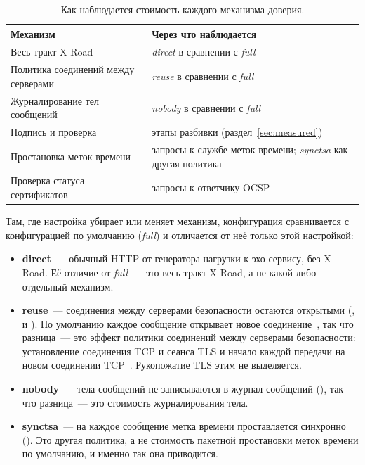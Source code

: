 \documentclass[conference,a4paper]{IEEEtran}
\begin{document}
\begin{table}[t]
\centering\small
\caption{Как наблюдается стоимость каждого механизма доверия.}
\label{tab:mech}
\begin{tabular}{@{}p{}p{}@{}}
\toprule
Механизм & Через что наблюдается \\
\midrule
Весь тракт X-Road & \emph{direct} в сравнении с \emph{full} \\
Политика соединений между серверами & \emph{reuse} в сравнении с \emph{full} \\
Журналирование тел сообщений & \emph{nobody} в сравнении с \emph{full} \\
Подпись и проверка & этапы разбивки (раздел~\ref{sec:measured}) \\
Простановка меток времени & запросы к службе меток времени; \emph{synctsa} как другая политика \\
Проверка статуса сертификатов & запросы к ответчику OCSP \\
\bottomrule
\end{tabular}
\end{table}

Там, где настройка убирает или меняет механизм, конфигурация сравнивается с конфигурацией по умолчанию
(\emph{full}) и отличается от неё только этой настройкой:

\begin{itemize}
  \item \textbf{direct}~--- обычный HTTP от генератора нагрузки к эхо-сервису, без X-Road.
  Её отличие от \emph{full}~--- это весь тракт X-Road, а не какой-либо отдельный механизм.
  \item {\sloppy \textbf{reuse}~--- соединения между серверами безопасности остаются открытыми
  (,  и
  ). По умолчанию каждое сообщение открывает новое
  соединение~\cite{xroadsyspar}, так что разница~--- это эффект политики соединений между
  серверами безопасности: установление соединения TCP и сеанса TLS и начало каждой
  передачи на новом соединении TCP~\cite{naylor2014}. Рукопожатие TLS этим не выделяется.\par}
  \item \textbf{nobody}~--- тела сообщений не записываются в журнал сообщений
  (), так что разница~--- это стоимость журналирования тела.
  \item \textbf{synctsa}~--- на каждое сообщение метка времени проставляется синхронно
  (). Это другая политика, а не стоимость
  пакетной простановки меток времени по умолчанию, и именно так она приводится.
\end{itemize}
\end{document}

